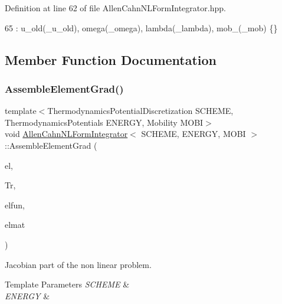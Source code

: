 Definition at line 62 of file Allen\+Cahn\+N\+L\+Form\+Integrator.\+hpp.


\begin{DoxyCode}
65     : u\_old(\_u\_old), omega(\_omega), lambda(\_lambda), mob\_(\_mob) \{\}
\end{DoxyCode}


\subsection{Member Function Documentation}
\mbox{\label{classAllenCahnNLFormIntegrator_a0370504d306247b934fee91ed117104a}} 
\subsubsection{\texorpdfstring{Assemble\+Element\+Grad()}{AssembleElementGrad()}}
{\footnotesize\ttfamily template$<$Thermodynamics\+Potential\+Discretization S\+C\+H\+E\+ME, Thermodynamics\+Potentials E\+N\+E\+R\+GY, Mobility M\+O\+BI$>$ \\
void \hyperlink{classAllenCahnNLFormIntegrator}{Allen\+Cahn\+N\+L\+Form\+Integrator}$<$ S\+C\+H\+E\+ME, E\+N\+E\+R\+GY, M\+O\+BI $>$\+::Assemble\+Element\+Grad (\begin{DoxyParamCaption}\item[{const mfem\+::\+Finite\+Element \&}]{el,  }\item[{mfem\+::\+Element\+Transformation \&}]{Tr,  }\item[{const mfem\+::\+Vector \&}]{elfun,  }\item[{mfem\+::\+Dense\+Matrix \&}]{elmat }\end{DoxyParamCaption})\hspace{0.3cm}{\ttfamily [virtual]}}



Jacobian part of the non linear problem. 


\begin{DoxyTemplParams}{Template Parameters}
{\em S\+C\+H\+E\+ME} & \\
\hline
{\em E\+N\+E\+R\+GY} & \\
\hline
\end{DoxyTemplParams}

